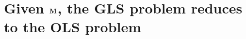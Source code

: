 


\section{Given \texorpdfstring{$\mathbf{M}$}{M}, the GLS problem reduces to the OLS problem}
\label{sec:givenM}

